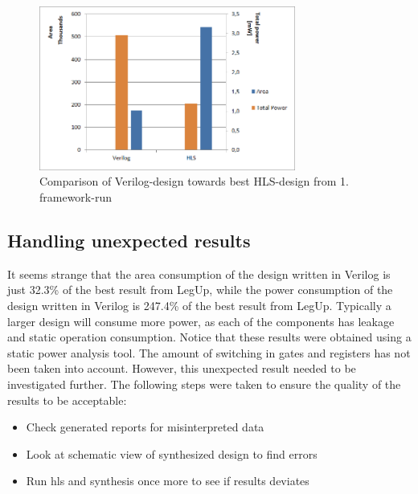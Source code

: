 \begin{figure}[hbpt]
\centering
\includegraphics[width=0.75\textwidth]{../figs/resultComparison1.png}
\caption{\label{fig:resultcomparisonhlsrun1}Comparison of Verilog-design towards best HLS-design from 1. framework-run}
\end{figure}

\subsection{Handling unexpected results}
It seems strange that the area consumption of the design written in Verilog is just 32.3\% of the best result from LegUp, while the power consumption of the design written in Verilog is 247.4\% of the best result from LegUp. Typically a larger design will consume more power, as each of the components has leakage and static operation consumption. Notice that these results were obtained using a static power analysis tool. The amount of switching in gates and registers has not been taken into account. However, this unexpected result needed to be investigated further. The following steps were taken to ensure the quality of the results to be acceptable:

\begin{itemize}
    \item Check generated reports for misinterpreted data
    \item Look at schematic view of synthesized design to find errors
    \item Run \gls{hls} and synthesis once more to see if results deviates
\end{itemize}

